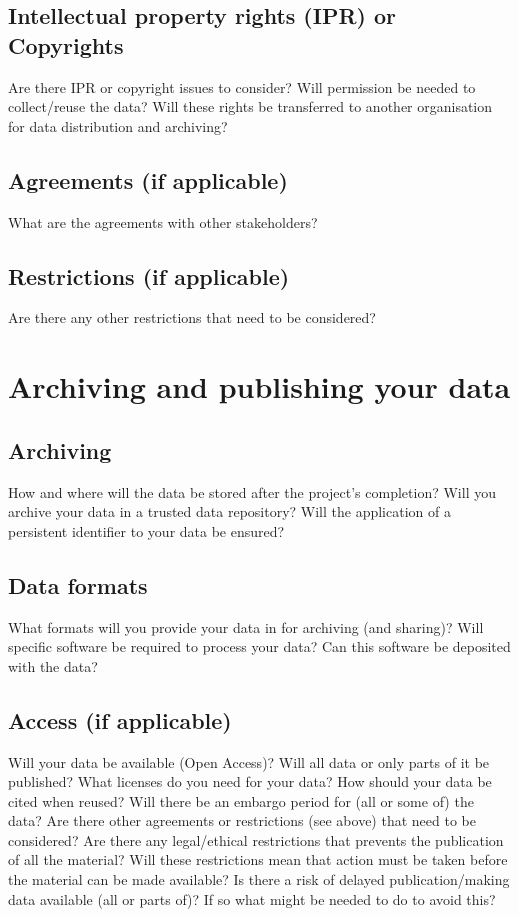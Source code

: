 \documentclass[11pt,a4paper]{article}
\begin{document}
	\subsection{Intellectual property rights (IPR) or Copyrights}
	Are there IPR or copyright issues to consider?
	Will permission be needed to collect/reuse the data?
	Will these rights be transferred to another organisation for data distribution and archiving?
	
	\subsection{Agreements (if applicable)}
	What are the agreements with other stakeholders?
	
	\subsection{Restrictions (if applicable)}
	Are there any other restrictions that need to be considered?
	
	\section{Archiving and publishing your data}
	\subsection{Archiving}
	How and where will the data be stored after the project’s completion?
	Will you archive your data in a trusted data repository?
	Will the application of a persistent identifier to your data be ensured?
	\subsection{Data formats}
	What formats will you provide your data in for archiving (and sharing)?
	Will specific software be required to process your data? Can this software be deposited
	with the data?
	\subsection{Access (if applicable)}
	Will your data be available (Open Access)?
	Will all data or only parts of it be published?
	What licenses do you need for your data?
	How should your data be cited when reused?
	Will there be an embargo period for (all or some of) the data?
	Are there other agreements or restrictions (see above) that need to be considered?
	Are there any legal/ethical restrictions that prevents the publication of all the material?
	Will these restrictions mean that action must be taken before the material can be
	made available?
	Is there a risk of delayed publication/making data available (all or parts of)?
	If so what might be needed to do to avoid this?
	
\end{document}

